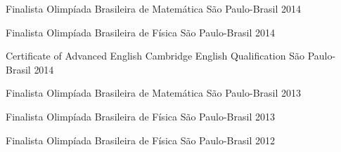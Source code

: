




\begin{cvhonors}


\cvhonor
{Finalista} %
{Olimpíada Brasileira de Matemática} %
{São Paulo-Brasil} %
{2014} %

\cvhonor
{Finalista} %
{Olimpíada Brasileira de Física} %
{São Paulo-Brasil} %
{2014} %

\cvhonor
{Certificate of Advanced English} %
{Cambridge English Qualification} %
{São Paulo-Brasil} %
{2014} %

\cvhonor
{Finalista} %
{Olimpíada Brasileira de Matemática} %
{São Paulo-Brasil} %
{2013} %


\cvhonor
{Finalista} %
{Olimpíada Brasileira de Física} %
{São Paulo-Brasil} %
{2013} %

\cvhonor
{Finalista} %
{Olimpíada Brasileira de Física} %
{São Paulo-Brasil} %
{2012} %




\end{cvhonors}


